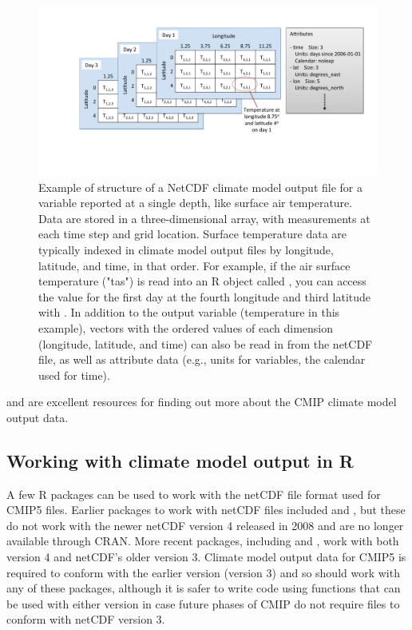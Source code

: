 \begin{figure}
\begin{center}
\includegraphics[width = \textwidth]{netcdf_figure}
\end{center}
\caption{Example of structure of a NetCDF climate model output file for a variable reported at a single depth, like surface air temperature. Data are stored in a three-dimensional array, with measurements at each time step and grid location. Surface temperature data are typically indexed in climate model output files by longitude, latitude, and time, in that order. For example, if the air surface temperature ("tas") is read into an R object called , you can access the value for the first day at the fourth longitude and third latitude with . In addition to the output variable (temperature in this example), vectors with the ordered values of each dimension (longitude, latitude, and time) can also be read in from the netCDF file, as well as attribute data (e.g., units for variables, the calendar used for time).}
\label{fig:netcdfexample}
\end{figure}

\citet{taylor2012overview} and \citet{meehl2007wcrp} are excellent
resources for finding out more about the CMIP climate model output data.

\subsection{Working with climate model output in
R}\label{working-with-climate-model-output-in-r}

A few R packages can be used to work with the netCDF file format used
for CMIP5 files. Earlier packages to work with netCDF files included
 and , but these do not work with the newer netCDF
version 4 released in 2008 and are no longer available through CRAN.
More recent packages, including  \citep{ncdf4} and
 \citep{michna2013rnetcdf, RNetCDF}, work with both version
4 and netCDF's older version 3. Climate model output data for CMIP5 is
required to conform with the earlier version (version 3)
\citep{taylor2010cmip5} and so should work with any of these packages,
although it is safer to write code using functions that can be used with
either version in case future phases of CMIP do not require files to
conform with netCDF version 3.

